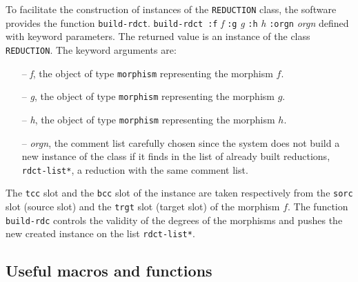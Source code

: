 To facilitate the construction of instances of the  {\tt REDUCTION} class, the
software provides the function {\tt build-rdct}.
\vskip 0.45cm
{\tt build-rdct :f} {\em f} {\tt :g} {\em g} {\tt :h} {\em h} {\tt :orgn} {\em orgn}
\vskip 0.40cm
defined with keyword parameters. The returned value is an instance of the class {\tt REDUCTION}. 
The keyword arguments are:
\begin{itemize}
\item[--] {\em f}, the object of type {\tt morphism}  representing the morphism $f$.
\item[--] {\em g}, the object of type {\tt morphism}  representing the morphism $g$.
\item[--] {\em h}, the object of type {\tt morphism}  representing the morphism $h$.
\item[--] {\em orgn}, the comment list carefully chosen since the system does not
build a new instance of the class if it finds in the list of already built reductions, {\tt *rdct-list*},
a reduction  with the same comment list.
\end{itemize}
The {\tt tcc} slot and the {\tt bcc} slot of the instance are taken respectively
from the {\tt sorc} slot (source slot) and  the {\tt trgt} slot (target slot) of the morphism $f$. 
The function {\tt build-rdc} controls the validity of the degrees of the morphisms and
pushes the new created  instance on the list {\tt *rdct-list*}. 

\newpage

\subsection {Useful macros and functions}

